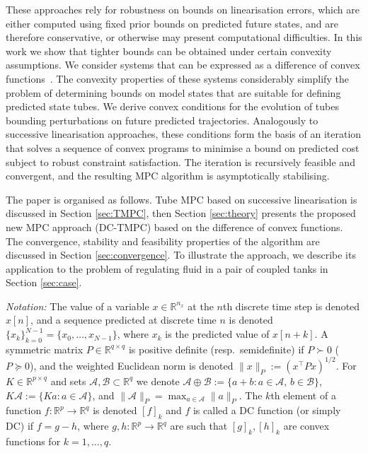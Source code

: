 \documentclass[a4paper, 10 pt, conference]{IEEEconf}
\def\RR{\mathbb{R}}
\def\NN{\mathbb{N}}
\def\A{\mathcal{A}}
\def\B{\mathcal{B}}
\begin{document}
These approaches rely for robustness on bounds on linearisation errors, which are either computed using fixed prior bounds on predicted future states, and are therefore conservative, or otherwise may present computational difficulties. In this work we show that tighter bounds can be obtained under certain convexity assumptions. We consider systems that can be expressed as a difference of convex functions~\cite{horst99:dcprog,hartman59:dcfun}. 
The convexity properties of these systems considerably simplify the problem of determining bounds on model states that are suitable for defining predicted state tubes. We derive convex conditions for the evolution of tubes bounding perturbations on future predicted trajectories. Analogously to successive linearisation approaches, these conditions form the basis of an iteration that solves a sequence of convex programs to minimise a bound on predicted cost subject to robust constraint satisfaction. The iteration is recursively feasible and convergent, and the resulting MPC algorithm is asymptotically stabilising. 

The paper is organised as follows. 
Tube MPC based on successive linearisation is discussed in Section  \ref{sec:TMPC}, then Section \ref{sec:theory} presents the proposed new MPC approach (DC-TMPC) based on the difference of convex functions. The convergence, stability and feasibility properties of the algorithm are discussed in Section  \ref{sec:convergence}. To illustrate the approach, we describe its application to the problem of regulating fluid in a pair of coupled tanks in Section \ref{sec:case}. 

\textit{Notation:}
The value of a variable $x\in \RR^{n_{x}}$ at the $n$th discrete time step is denoted $x[n]$, and a sequence predicted at discrete time $n$ is denoted %
$\{x_{k}\}_{k=0}^{N-1}=\{ x_{0} , \ldots, x_{N-1}\}$, 
where $x_{k}$ is the predicted value of $x[n+k]$.
%
A symmetric matrix $P\in\RR^{q\times q}$ is positive definite (resp.~semidefinite)  if ${P\succ 0}$ ($P\succeq 0$), and the weighted Euclidean norm is denoted $\lVert x\rVert_P := (x^\top P x)^{1/2}$.
%
For $K\in\RR^{p\times q}$ and sets $\A,\B\subset\RR^{q}$ we denote $\A \oplus \B := \{a + b : a \in \A, \, b \in \B\}$, $ K \A := \{K a : a \in \A \}$, and $\lVert \A \rVert_P = \max_{a\in\A} \lVert a \rVert_P$.
%
The $k$th element of a function $f:\RR^p\to\RR^q$ is denoted $[f]_k$ and $f$ is called a DC function (or simply DC) if $f = g - h$, where $g,h:\RR^p\to\RR^q$ are such that $[g]_k,[h]_k$ are convex functions for $k=1,\ldots,q$.
\end{document}

